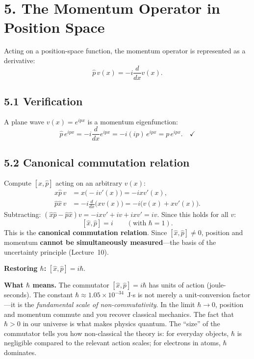 \documentclass[12pt,a4paper]{article}
\begin{document}
\section{5. The Momentum Operator in Position Space}

Acting on a position-space function, the momentum operator is represented as a derivative:
\[
    \boxed{\hat{p}\,v(x) = -i\frac{d}{dx}v(x).}
\]

\subsection{5.1 Verification}
A plane wave $v(x)=e^{ipx}$ is a momentum eigenfunction:
\[
    \hat{p}\,e^{ipx} = -i\frac{d}{dx}e^{ipx} = -i(ip)\,e^{ipx} = p\,e^{ipx}. \quad\checkmark
\]

\subsection{5.2 Canonical commutation relation}
Compute $[\hat{x},\hat{p}]$ acting on an arbitrary $v(x)$:
\begin{align}
    \hat{x}\hat{p}\,v &= x\bigl(-iv'(x)\bigr) = -ixv'(x), \\
    \hat{p}\hat{x}\,v &= -i\frac{d}{dx}\bigl(xv(x)\bigr) = -i\bigl(v(x)+xv'(x)\bigr).
\end{align}
Subtracting: $(\hat{x}\hat{p}-\hat{p}\hat{x})v = -ixv'+iv+ixv' = iv$.  Since this holds for all $v$:
\[
    \boxed{[\hat{x},\hat{p}] = i} \qquad (\text{with } \hbar=1).
\]
This is the \textbf{canonical commutation relation}.  Since $[\hat{x},\hat{p}]\neq 0$, position and momentum \textbf{cannot be simultaneously measured}---the basis of the uncertainty principle (Lecture~10).

\noindent\textbf{Restoring $\hbar$:} $[\hat{x},\hat{p}]=i\hbar$.

\medskip
\noindent\textbf{What $\hbar$ means.}  The commutator $[\hat{x},\hat{p}]=i\hbar$ has units of action (joule-seconds).  The constant $\hbar \approx 1.05\times 10^{-34}$~J$\cdot$s is not merely a unit-conversion factor---it is the \emph{fundamental scale of non-commutativity}.  In the limit $\hbar\to 0$, position and momentum commute and you recover classical mechanics.  The fact that $\hbar > 0$ in our universe is what makes physics quantum.  The ``size'' of the commutator tells you how non-classical the theory is: for everyday objects, $\hbar$ is negligible compared to the relevant action scales; for electrons in atoms, $\hbar$ dominates.
\end{document}
